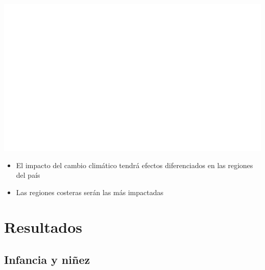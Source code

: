 \documentclass[aspectratio=169]{beamer}
\begin{document}
    \begin{slide}{11} 
                      \begin{imagecolumn}
                \includegraphics[width=\columnwidth]{img/var_299_map.png}
            \end{imagecolumn}
            \begin{textcolumn}
                \begin{itemize}
                    \item El impacto del cambio climático tendrá efectos diferenciados en las regiones del país
                    \item Las regiones costeras serán las más impactadas
                \end{itemize}
            \end{textcolumn}

    \printcolumns
    \end{slide}
    
    
     \section{Resultados}
    
    \subsection{Infancia y niñez}
\end{document}
